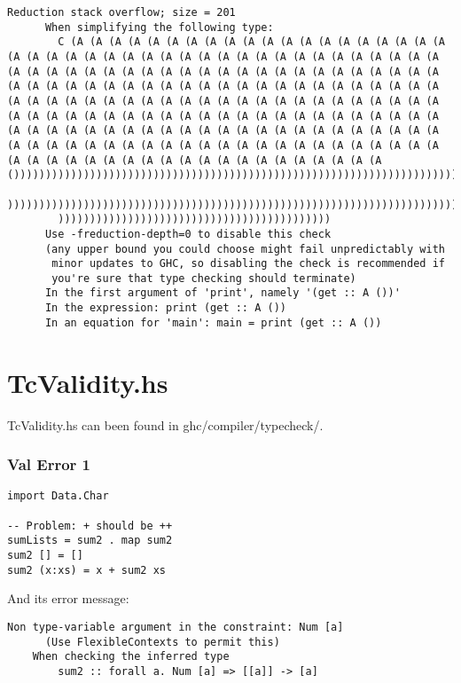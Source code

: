 \documentclass[a4paper]{article}
\begin{document}
\begin{lstlisting}[label={lst: T??.0.2}, numbers=none, caption={Error}]
 Reduction stack overflow; size = 201
      When simplifying the following type:
        C (A (A (A (A (A (A (A (A (A (A (A (A (A (A (A (A (A (A (A (A (A (A (A (A (A (A (A (A (A (A (A (A (A (A (A (A (A (A (A (A (A (A (A (A (A (A (A (A (A (A (A (A (A (A (A (A (A (A (A (A (A (A (A (A (A (A (A (A (A (A (A (A (A (A (A (A (A (A (A (A (A (A (A (A (A (A (A (A (A (A (A (A (A (A (A (A (A (A (A (A (A (A (A (A (A (A (A (A (A (A (A (A (A (A (A (A (A (A (A (A (A (A (A (A (A (A (A (A (A (A (A (A (A (A (A (A (A (A (A (A (A (A (A (A (A (A (A (A (A (A (A (A (A (A (A (A (A (A (A (A (A (A (A (A (A (A (A (A (A (A (A (A (A (A (A (A (A (A (A (A (A (A (A (A (A (A (A (A (A (A (A (A (A (A (A (A (A (A (A (A (A ()))))))))))))))))))))))))))))))))))))))))))))))))))))))))))))))))))))))))))))))))))
        ))))))))))))))))))))))))))))))))))))))))))))))))))))))))))))))))))))))))))))
        )))))))))))))))))))))))))))))))))))))))))))
      Use -freduction-depth=0 to disable this check
      (any upper bound you could choose might fail unpredictably with
       minor updates to GHC, so disabling the check is recommended if
       you're sure that type checking should terminate)
      In the first argument of 'print', namely '(get :: A ())'
      In the expression: print (get :: A ())
      In an equation for 'main': main = print (get :: A ())

\end{lstlisting}


\section{TcValidity.hs}

TcValidity.hs can been found in ghc/compiler/typecheck/. 

\subsubsection{Val Error 1}

\begin{lstlisting}[label={lst: T22.0}, numbers=none, caption={Example Program}]
import Data.Char

-- Problem: + should be ++
sumLists = sum2 . map sum2                       
sum2 [] = []
sum2 (x:xs) = x + sum2 xs
\end{lstlisting}

And its error message:
\hfill \break
\hfill \break
\begin{lstlisting}[label={lst: T22.0.2}, numbers=none, caption={Error}]
Non type-variable argument in the constraint: Num [a]
      (Use FlexibleContexts to permit this)
    When checking the inferred type
        sum2 :: forall a. Num [a] => [[a]] -> [a]
\end{lstlisting}
\end{document}
